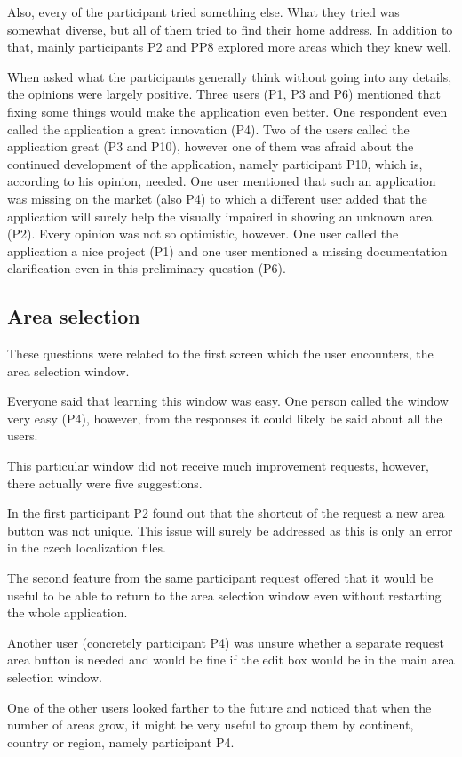 \documentclass[nolof,digital]{fithesis3}
\begin{document}
Also, every of the participant tried something else. What they tried was somewhat diverse, but all of them tried to find their home address. In addition to that, mainly participants P2 and PP8 explored more areas which they knew well.

When asked what the participants generally think without going into any details, the opinions were largely positive. Three users (P1, P3 and P6) mentioned that fixing some things would make the application even better. One respondent even called the application a great innovation (P4). Two of the users called the application great (P3 and P10), however one of them was afraid about the continued development of the application, namely participant P10,  which is, according to his opinion, needed. One user mentioned that such an application was missing on the market (also P4) to which a different user added that the application will surely help the visually impaired in showing an unknown area (P2). Every opinion was not so optimistic, however. One user called the application a nice project (P1) and one user mentioned a missing documentation clarification even in this preliminary question (P6).
\subsection{Area selection}
These questions were related to the first screen which the user encounters, the area selection window.

Everyone said that learning this window was easy. One person called the window very easy (P4), however, from the responses it could likely be said about all the users.

This particular window did not receive much improvement requests, however, there actually were five suggestions.

In the first participant P2 found out that the shortcut of the request a new area button was not unique. This issue will surely be addressed as this is only an error in the czech localization files.

The second feature from the same participant request offered that it would be useful to be able to return to the area selection window even without restarting the whole application.

Another user (concretely participant P4) was unsure whether a separate request area button is needed and would be fine if the edit box would be in the main area selection window.

One of the other users looked farther to the future and noticed that when the number of areas grow, it might be very useful to group them by continent, country or region, namely participant P4.
\end{document}
